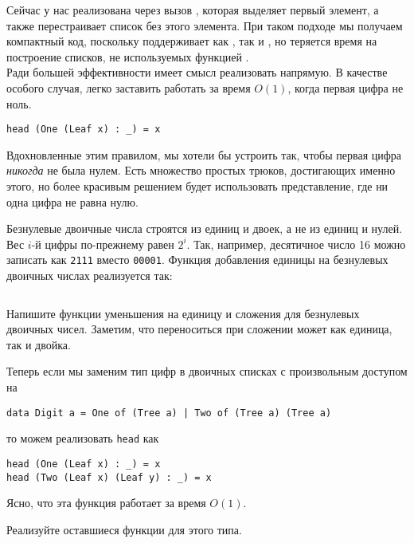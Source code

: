 \begin{frame}[fragile]{}
Сейчас  у нас реализована через вызов
, которая выделяет первый элемент, а также
перестраивает список без этого элемента. При таком подходе мы получаем
компактный код, поскольку  поддерживает как
, так и , но теряется время
на построение списков, не используемых функцией
. \\

 Ради большей эффективности имеет смысл реализовать
 напрямую. В качестве особого случая, легко заставить
 работать за время $O(1)$, когда первая цифра не ноль.
\begin{verbatim}
head (One (Leaf x) : _) = x
\end{verbatim}
Вдохновленные этим правилом, мы хотели бы устроить так, чтобы первая
цифра \emph{никогда} не была нулем. Есть множество простых трюков,
достигающих именно этого, но более красивым решением будет
использовать  представление, где ни одна
цифра не равна нулю.
\end{frame}

\begin{frame}[fragile]{}
Безнулевые двоичные числа строятся из единиц и двоек, а не из единиц и
нулей. Вес $i$-й цифры по-прежнему равен $2^i$. Так, например,
десятичное число 16 можно записать как \texttt{2111} вместо
\texttt{00001}. Функция добавления единицы на безнулевых двоичных
числах реализуется так:
\inputminted[firstline=3,lastline=8]{haskell}{code/ZerolessNumbers.hs}

\begin{exercise}\label{ex:9.4}
  Напишите функции уменьшения на единицу и сложения для безнулевых
  двоичных чисел. Заметим, что переноситься при сложении может как
  единица, так и двойка.
\end{exercise}
\end{frame}

\begin{frame}[fragile]{}
Теперь если мы заменим тип цифр в двоичных списках с произвольным
доступом на
\begin{verbatim}
data Digit a = One of (Tree a) | Two of (Tree a) (Tree a)
\end{verbatim}
то можем реализовать \lstinline!head! как
\begin{verbatim}
head (One (Leaf x) : _) = x
head (Two (Leaf x) (Leaf y) : _) = x
\end{verbatim}
Ясно, что эта функция работает за время $O(1)$.

\begin{exercise}\label{ex:9.5}
  Реализуйте оставшиеся функции для этого типа.
\end{exercise}

\end{frame}

